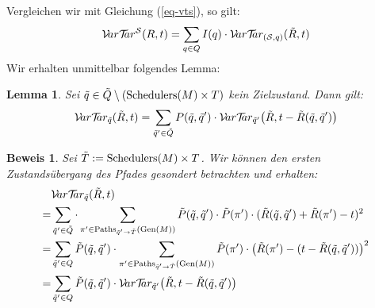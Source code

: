 \documentclass[a4paper]{article}
\newtheorem{lemma}[satz]{Lemma}
\theoremstyle{nonumberplain}
\newtheorem{beweis}{Beweis}
\begin{document}
	Vergleichen wir mit Gleichung (\ref{eq-vts}), so gilt:
	\begin{equation}
	\mathcal{V}\!ar \mathcal{T}\!\!ar^{\mathcal{S}}(R,t) = \sum_{q \in Q}{I(q)} \cdot \mathcal{V}\!ar \mathcal{T}\!\!ar_{(\mathcal{S},q)}(\tilde{R},t)
	\end{equation}
	Wir erhalten unmittelbar folgendes Lemma:
	\begin{lemma}\label{lem-vt-conditioning}
		Sei $\tilde{q} \in \tilde{Q} \setminus (\mathrm{Schedulers}(M)\times T)$ kein Zielzustand. Dann gilt:
		\begin{equation}
		\mathcal{V}\!ar \mathcal{T}\!\!ar_{\tilde{q}}(\tilde{R},t) = \sum_{\tilde{q}' \in \tilde{Q}} P(\tilde{q},\tilde{q}') \cdot \mathcal{V}\!ar \mathcal{T}\!\!ar_{\tilde{q}'}\big(\tilde{R},t -\tilde{R}(\tilde{q},\tilde{q}')\big)
		\end{equation}
	\end{lemma}
	\begin{beweis}
		Sei $\tilde{T} := \mathrm{Schedulers}(M)\times T$. Wir können den ersten Zustandsübergang des Pfades gesondert betrachten und erhalten:
		\begin{align*}
		&\mathcal{V}\!ar \mathcal{T}\!\!ar_{\tilde{q}}(\tilde{R},t)\\
		=& \sum_{\tilde{q}' \in \tilde{Q}} \cdot \sum_{\pi' \in \mathrm{Paths}_{\tilde{q}' \rightarrow \tilde{T}}(\mathrm{Gen}(M))}{\tilde{P}(\tilde{q},\tilde{q}') \cdot \tilde{P}(\pi') \cdot (\tilde{R}(\tilde{q},\tilde{q}') + \tilde{R}(\pi') - t)^2}\\
		=& \sum_{\tilde{q}' \in Q} \tilde{P}(\tilde{q},\tilde{q}') \cdot \sum_{\pi' \in \mathrm{Paths}_{\tilde{q}' \rightarrow \tilde{T}}(\mathrm{Gen}(M))}{\tilde{P}(\pi') \cdot \big(\tilde{R}(\pi') - (t- \tilde{R}(\tilde{q},\tilde{q}'))\big)^2}\\
		=& \sum_{\tilde{q}' \in Q} \tilde{P}(\tilde{q},\tilde{q}') \cdot \mathcal{V}\!ar \mathcal{T}\!\!ar_{\tilde{q}'}\big(\tilde{R},t -\tilde{R}(\tilde{q},\tilde{q}')\big)
		\end{align*}
	\end{beweis}
	
\end{document}
